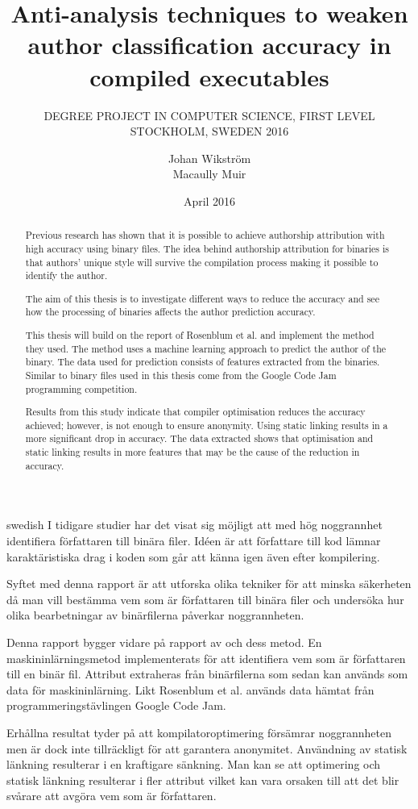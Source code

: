 \documentclass[a4paper,11pt]{kth-mag}
\title{Anti-analysis techniques to weaken author classification accuracy in compiled executables}
\subtitle{
    DEGREE PROJECT IN COMPUTER SCIENCE, FIRST LEVEL \\
    STOCKHOLM, SWEDEN 2016
}
\author{Johan Wikström \\ Macaully Muir}
\date{April 2016}
\begin{document}
\frontmatter
\pagestyle{empty}
\removepagenumbers
\maketitle
{}
\begin{abstract}
Previous research has shown that it is possible to achieve authorship
attribution with high accuracy using binary files. The idea behind authorship
attribution for binaries is that authors’ unique style will survive the
compilation process making it possible to identify the author.    

The aim of this thesis is to investigate different ways to reduce the accuracy
and see how the processing of binaries affects the author prediction accuracy.

This thesis will build on the report of Rosenblum et al. and implement the method
they used. The method uses a machine learning approach to predict the author
of the binary. The data used for prediction consists of features extracted from
the binaries. Similar to \parencite{rosenblum2011wrote} binary files used in this
thesis come from the Google Code Jam programming competition.

Results from this study indicate that compiler optimisation reduces the accuracy
achieved; however, is not enough to ensure anonymity. Using static linking
results in a more significant drop in accuracy. The data extracted shows that
optimisation and static linking results in more features that may be the cause
of the reduction in accuracy.
\end{abstract}
\clearpage
\begin{foreignabstract}{swedish}
I tidigare studier har det visat sig möjligt att med hög noggrannhet
identifiera författaren till binära filer. Idéen är att författare till kod
lämnar karaktäristiska drag i koden som går att känna igen även efter
kompilering. 

Syftet med denna rapport är att utforska olika tekniker för att minska
säkerheten då man vill bestämma vem som är författaren till binära filer och
undersöka hur olika bearbetningar av binärfilerna påverkar noggrannheten.     

Denna rapport bygger vidare på rapport av \parencite{rosenblum2011wrote}
och dess metod. En maskininlärningsmetod implementerats för
att identifiera vem som är författaren till en binär fil. Attribut extraheras
från binärfilerna som sedan kan används som data för maskininlärning. Likt
Rosenblum et al. används data hämtat från programmeringstävlingen Google Code
Jam. 

Erhållna resultat tyder på att kompilatoroptimering försämrar noggrannheten men är dock
inte tillräckligt för att garantera anonymitet. Användning av statisk länkning
resulterar i en kraftigare sänkning. Man kan se att optimering och statisk
länkning resulterar i fler attribut vilket kan vara orsaken till att det blir
svårare att avgöra vem som är författaren.
\end{foreignabstract}
\clearpage
\tableofcontents*
\mainmatter
\pagestyle{newchap}
\end{document}
